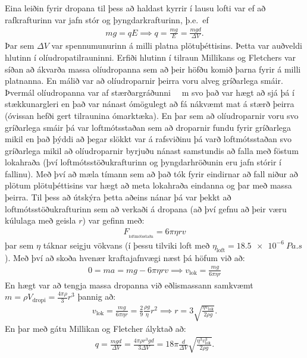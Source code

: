 \ifdefined \wholebook \else\documentclass[oneside]{book}\usepackage{EdlBook}\graphicspath{{figures/}}
\begin{document}
Eina leiðin fyrir dropana til þess að haldast kyrrir í lausu lofti var ef að rafkrafturinn var jafn stór og þyngdarkrafturinn, þ.e.~ef
\begin{align*}
    mg = qE \implies q = \frac{mg}{E} = \frac{mgd}{\Delta V}.
\end{align*}
Þar sem $\Delta V$ var spennumunurinn á milli platna plötuþéttisins. Þetta var auðveldi hlutinn í olíudropatilrauninni. Erfiði hlutinn í tilraun Millikans og Fletchers var síðan að ákvarða massa olíudropanna sem að þeir höfðu komið þarna fyrir á milli platnanna. En málið var að olíudroparnir þeirra voru alveg gríðarlega smáir. Þvermál olíudropanna var af stærðargráðunni \SI{}{\mu m} svo það var hægt að sjá þá í stækkunargleri en það var nánast ómögulegt að fá nákvæmt mat á stærð þeirra (óvissan hefði gert tilraunina ómarktæka). En þar sem að olíudroparnir voru svo gríðarlega smáir þá var loftmótsstaðan sem að droparnir fundu fyrir gríðarlega mikil en það þýddi að þegar slökkt var á rafsviðinu þá varð loftmótsstaðan svo gríðarlega mikil að olíudroparnir byrjuðu nánast samstundis að falla með föstum lokahraða (því loftmótsstöðukrafturinn og þyngdarhröðunin eru jafn stórir í fallinu). Með því að mæla tímann sem að það tók fyrir eindirnar að fall niður að plötum plötuþéttisins var hægt að meta lokahraða eindanna og þar með massa þeirra. Til þess að útskýra þetta aðeins nánar þá var þekkt að loftmótsstöðukrafturinn sem að verkaði á dropana (að því gefnu að þeir væru kúlulaga með geisla $r$) var gefinn með:
\begin{align*}
    F_{\!_\text{loftmótsstaða}} = 6\pi \eta rv
\end{align*}
þar sem $\eta$ táknar seigju vökvans (í þessu tilviki loft með $\eta_{\text{loft}} = \SI{18.5e-6}{Pa.s}$). Með því að skoða hvenær kraftajafnvægi næst þá höfum við að:
\begin{align*}
    0 = ma = mg - 6\pi \eta rv \implies v_{\text{lok}} = \frac{mg}{6\pi \eta r} 
\end{align*}
En hægt var að tengja massa dropanna við eðlismassann samkvæmt $m = \rho V_{\text{dropi}} = \frac{4 \pi \rho}{3}r^3$ þannig að:
\begin{align*}
    v_{\text{lok}} = \frac{mg}{6\pi \eta r} = \frac{2}{9} \frac{\rho g}{\eta} r^2 \implies r = 3\sqrt{\frac{\eta v_{\text{lok}}}{2 \rho g}}.
\end{align*}
En þar með gátu Millikan og Fletcher ályktað að:
\begin{align*}
    q = \frac{mgd}{\Delta V} = \frac{4 \pi \rho r^3 g d}{3 \Delta V} = 18 \pi \frac{d}{\Delta V} \sqrt{\frac{\eta^3 v^3_{\text{lok}}}{2 \rho g}}.
\end{align*}
\end{document}
